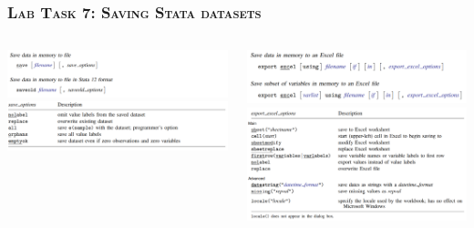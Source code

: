 \documentclass[10pt]{beamer}
\begin{document}
	\begin{frame}
	\frametitle{\textsc{Lab Task 7: Saving Stata datasets}}	
		\begin{columns}
			\begin{column}{0.5\textwidth}
				\includegraphics[width=\linewidth]{helpfile_save_1}
				\includegraphics[width=\linewidth]{helpfile_save_2}
			\end{column}
			\begin{column}{0.5\textwidth}
				\includegraphics[width=\linewidth]{helpfile_exportexcel_1}
				\includegraphics[width=\linewidth]{helpfile_exportexcel_2}
			\end{column}
		\end{columns}
	\end{frame}
	
\end{document}
